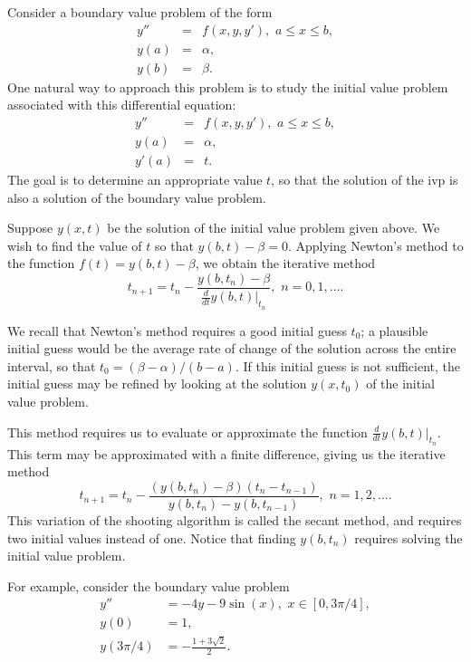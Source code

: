 \label{lab:Shooting}

Consider a boundary value problem of the form 
\begin{eqnarray*}
y'' &=& f(x,y,y'), \,\, a \leq x \leq b, \\
y(a) &=& \alpha, \\
y(b) &=& \beta. 
\end{eqnarray*}
One natural way to approach this problem is to study the initial value problem associated with this differential equation: 
\begin{eqnarray*}
y'' &=& f(x,y,y'), \,\, a \leq x \leq b, \\
y(a) &=& \alpha, \\
y'(a) &=& t. 
\end{eqnarray*}
The goal is to determine an  appropriate value $t$, so that the solution of the ivp is also a solution of the boundary value problem. 

Suppose $y(x,t)$ be the solution of the initial value problem given above. We wish to find the value of $t$ so that 
$y(b,t) - \beta = 0$. 
Applying Newton's method to the function $f(t) = y(b,t) - \beta$, we obtain the iterative method 
\[t_{n+1} = t_n - \frac{ y(b,t_n) - \beta}{\frac{d}{dt} \left.y(b,t)\right|_{t_n} }, \,\, n = 0,1,\hdots .\]

We recall that Newton's method requires a good initial guess $t_0$; a plausible initial guess would be the average rate of change of the solution across the entire interval, so that $t_0 =  (\beta - \alpha)/(b-a)$. If this initial guess is not sufficient, the initial guess may be refined by looking at the solution $y(x,t_0)$ of the initial value problem.

This method requires us to evaluate or approximate the function $\frac{d}{dt} \left.y(b,t)\right|_{t_n}$. This term may be approximated with a finite difference, giving us the iterative method
\[t_{n+1} = t_n - \frac{ (y(b,t_n) - \beta)(t_n - t_{n-1})}{y(b,t_n) - y(b,t_{n-1}) }, \,\, n = 1, 2,\hdots .\]
This variation of the shooting algorithm is called the secant method, and requires two initial values instead of one. Notice that finding $y(b,t_n)$ requires solving the initial value problem.

For example, consider the boundary value problem
\begin{equation}
\begin{split}
\label{bvp1}
y'' &= -4y -9\sin(x), \,\, x \in [0,3\pi/4],\\
y(0) &= 1, \\
y(3 \pi/4) &= -\frac{1+3\sqrt{2}}{2}.
\end{split}
\end{equation}


